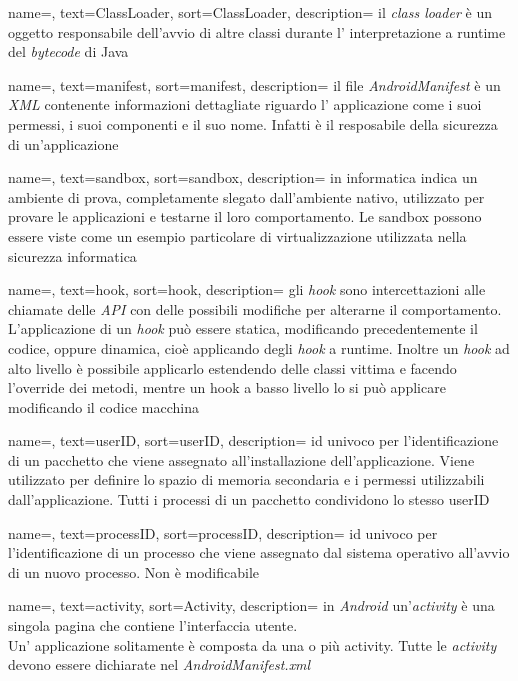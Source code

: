 {
	name=,
	text=ClassLoader,
	sort=ClassLoader,
	description={ il \emph{class loader} è un oggetto responsabile dell'avvio di altre classi durante l' interpretazione a runtime del \emph{bytecode} di Java }
}

{
	name=,
	text=manifest,
	sort=manifest,
	description={ il file \emph{AndroidManifest} è un \emph{XML} contenente informazioni dettagliate riguardo l' applicazione come i suoi permessi, i suoi componenti e il suo nome. Infatti è il resposabile della sicurezza di un'applicazione   }
}

{
	name=,
	text=sandbox,
	sort=sandbox,
	description={ in informatica indica un ambiente di prova, completamente slegato dall'ambiente nativo, utilizzato per provare le applicazioni e testarne il loro comportamento. Le sandbox possono essere viste come un esempio particolare di virtualizzazione utilizzata nella sicurezza informatica }
}

{
	name=,
	text=hook,
	sort=hook,
	description={ gli \emph{hook} sono intercettazioni alle chiamate delle \emph{API} con delle possibili modifiche per alterarne il comportamento. L'applicazione di un \emph{hook} può essere statica, modificando precedentemente il codice, oppure dinamica, cioè applicando degli \emph{hook} a runtime. Inoltre un \emph{hook} ad alto livello è possibile applicarlo estendendo delle classi vittima e facendo l'override dei metodi, mentre un hook a basso livello lo si può applicare modificando il codice macchina }
}


{
	name=,
	text=userID,
	sort=userID,
	description={ id univoco per l'identificazione di un pacchetto che viene assegnato all'installazione dell'applicazione. Viene utilizzato per definire lo spazio di memoria secondaria e i permessi utilizzabili dall'applicazione. Tutti i processi di un pacchetto condividono lo stesso userID   }
}

{
	name=,
	text=processID,
	sort=processID,
	description={ id univoco per l'identificazione di un processo che viene assegnato dal sistema operativo all'avvio di un nuovo processo. Non è modificabile }
}

{
	name=,
	text=activity,
	sort=Activity,
	description={ in \emph{Android} un'\emph{activity} è una singola pagina che contiene l'interfaccia utente.\\ Un' applicazione solitamente è composta da una o più activity. Tutte le \emph{activity} devono essere dichiarate nel \emph{AndroidManifest.xml} }
}

